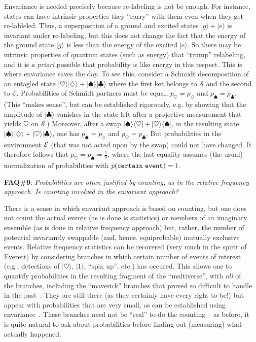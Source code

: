 \documentclass[aps,amsmath,amssymb,amsfonts,floatfix]{revtex4-1}
\newcommand{\bra}[1]    {\langle #1|}
\newcommand{\ket}[1]    {| #1 \rangle}
\newcommand{\cS}        {{\mathcal S}}
\newcommand{\cE}        {{\mathcal E}}
\newcommand{\+}         {\dagger}
\begin{document}
{{{Envariance is needed precisely because re-labeling is not be enough. For instance, states can have intrinsic properties they ``carry'' with them even when they get re-lableled. Thus, a superposition of a ground and excited states $\ket g + \ket e$ is invariant under re-labeling, but this does not change the fact that the energy of the ground state $\ket g$ is less than the energy of the excited $\ket e$. So there may be intrinsic properties of quantum states (such as energy) that ``trump'' relabeling, and it is {\it a priori} possible that probability is like energy in this respect. This is where envariance saves the day. To see this, consider a Schmidt decomposition of an entagled state 
$\ket \heartsuit \ket \diamondsuit + \ket \spadesuit \ket \clubsuit $ where the first ket belongs to $\cS$ and the second to $\cE$. Probabilities of Schmidt partners must be equal, $p_{\heartsuit} = p_{\diamondsuit}$ and $p_{\spadesuit}=p_{\clubsuit}$. (This ``makes sense'', but can be established rigorously, e.g. by showing that the amplitude of $\ket \clubsuit$ vanishes in the state left after a projective measurement that yields $\heartsuit$ on $\cS$.) Moreover, after a swap $\ket \spadesuit \bra \heartsuit + \ket \heartsuit \bra \spadesuit$, in the resulting state $\ket \spadesuit \ket \diamondsuit + \ket \heartsuit \ket \clubsuit $, one has $p_{\spadesuit} = p_{\diamondsuit}$ and $p_{\heartsuit }=p_{\clubsuit}$. But probabilities in the environment ${\cal E}$ (that was not acted upon by the swap) could not have changed. It therefore follows that $p_{\heartsuit} = p_{\spadesuit}=\frac 1 2$, where the last equality assumes (the usual) normalization of probabilities with $p({\tt certain \ event}) = 1$. 

{\bf FAQ\#9}: {\it Probabilities are often justified by counting, as in the relative frequency approach. Is  counting involved in the envariant approach?}

There is a sense in which envariant approach is based on counting, but one does not count the actual events (as is done is statistics) or members of an imaginary ensemble (as is done in relative frequency approach) but, rather, the number of potential invariantly swappable (and, hence, equiprobable) mutually exclusive events. Relative frequency statistics can be recovered (very much in the spirit of Everett) by considering branches in which certain number of events of interest (e.g., detections of $\ket \heartsuit$, $\ket 1$, ``spin up'', etc.) has occured. This allows one to quantify probabilities in the resulting fragment of the ``multiverse'', with {\it all} of the branches, including the ``maverick'' branches that proved so difficult to handle in the past~\cite{20,21,22,31,48,49,37}. They are still there (as they certainly have every right to be!) but appear with probabilities that are very small, as can be established using envariance~\cite{78}. These branches need not be ``real'' to do the counting -- as before, it is quite natural to ask about probabilities before finding out (measuring) what actually happened.

}}}
\end{document}
